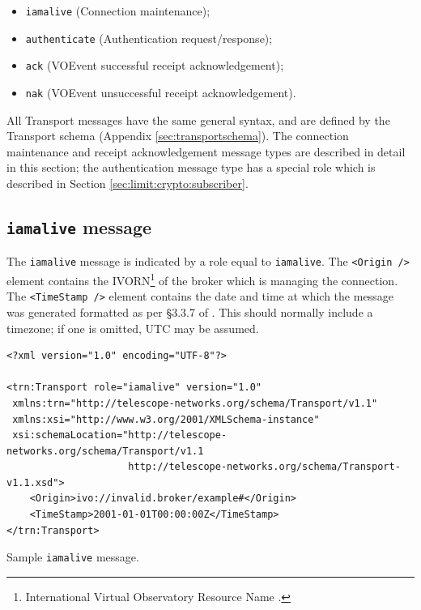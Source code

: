 \documentclass[a4paper,11pt]{ivoa}
\begin{document}
\begin{itemize}
\item{\texttt{iamalive} (Connection maintenance);}
\item{\texttt{authenticate} (Authentication request/response);}
\item{\texttt{ack} (VOEvent successful receipt acknowledgement);}
\item{\texttt{nak} (VOEvent unsuccessful receipt acknowledgement).}
\end{itemize}

All Transport messages have the same general syntax, and are defined by the
Transport schema (Appendix \ref{sec:transportschema}). The connection
maintenance and receipt acknowledgement message types are described in detail
in this section; the authentication message type has a special role which is
described in Section \ref{sec:limit:crypto:subscriber}.

\subsection{\texttt{iamalive} message}
\label{sec:transport:iamalive}

The \texttt{iamalive} message is indicated by a role equal to
\texttt{iamalive}. The \texttt{<Origin~/>} element contains the
IVORN\footnote{International Virtual Observatory Resource Name
\citep{Plante:2007}.} of the broker which is managing the connection. The
\texttt{<TimeStamp~/>} element contains the date and time at which the message
was generated formatted as per \S3.3.7 of \citet{Peterson:2012}. This should
normally include a timezone; if one is omitted, UTC may be assumed.

\begin{listing*}
\begin{verbatim}
<?xml version="1.0" encoding="UTF-8"?>

<trn:Transport role="iamalive" version="1.0"
 xmlns:trn="http://telescope-networks.org/schema/Transport/v1.1"
 xmlns:xsi="http://www.w3.org/2001/XMLSchema-instance"
 xsi:schemaLocation="http://telescope-networks.org/schema/Transport/v1.1
                     http://telescope-networks.org/schema/Transport-v1.1.xsd">
    <Origin>ivo://invalid.broker/example#</Origin>
    <TimeStamp>2001-01-01T00:00:00Z</TimeStamp>
</trn:Transport>
\end{verbatim}
\caption{Sample \texttt{iamalive} message.}
\label{lst:iamalive}
\end{listing*}
\end{document}
